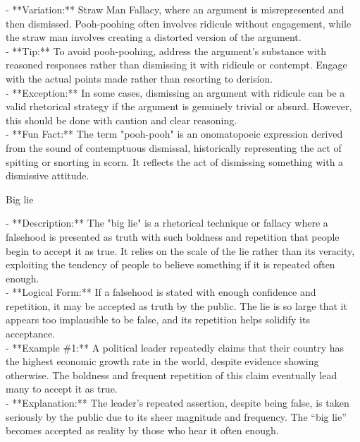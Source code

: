 \documentclass[a4paper,12pt,single,pdftex]{scrbook}
\begin{document}
{    
      - **Variation:** Straw Man Fallacy, where an argument is misrepresented and then dismissed. Pooh-poohing often involves ridicule without engagement, while the straw man involves creating a distorted version of the argument.
    \\

    
      - **Tip:** To avoid pooh-poohing, address the argument’s substance with reasoned responses rather than dismissing it with ridicule or contempt. Engage with the actual points made rather than resorting to derision.
    \\

    
      - **Exception:** In some cases, dismissing an argument with ridicule can be a valid rhetorical strategy if the argument is genuinely trivial or absurd. However, this should be done with caution and clear reasoning.
    \\

    
      - **Fun Fact:** The term "pooh-pooh" is an onomatopoeic expression derived from the sound of contemptuous dismissal, historically representing the act of spitting or snorting in scorn. It reflects the act of dismissing something with a dismissive attitude.
    \\

  }


Big lie
    
      - **Description:** The "big lie" is a rhetorical technique or fallacy where a falsehood is presented as truth with such boldness and repetition that people begin to accept it as true. It relies on the scale of the lie rather than its veracity, exploiting the tendency of people to believe something if it is repeated often enough.
    \\

    
      - **Logical Form:** If a falsehood is stated with enough confidence and repetition, it may be accepted as truth by the public. The lie is so large that it appears too implausible to be false, and its repetition helps solidify its acceptance.
    \\

    
      - **Example \#1:** A political leader repeatedly claims that their country has the highest economic growth rate in the world, despite evidence showing otherwise. The boldness and frequent repetition of this claim eventually lead many to accept it as true.
    \\

    
      - **Explanation:** The leader’s repeated assertion, despite being false, is taken seriously by the public due to its sheer magnitude and frequency. The “big lie” becomes accepted as reality by those who hear it often enough.
    \\
\end{document}
